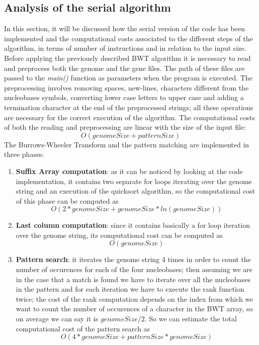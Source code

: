 \documentclass[final,5p,times,twocolumn,authoryear]{elsarticle}
\begin{document}
\subsection{Analysis of the serial algorithm}
In this section, it will be discussed how the serial version of the code has been implemented and the computational costs associated to the different steps of the algorithm, in terms of number of instructions and in relation to the input size. \\
Before applying the previously described BWT algorithm it is necessary to read and preprocess both the genome and the gene files. The path of these files are passed to the \emph{main()} function as parameters when the program is executed. The preprocessing involves removing spaces, new-lines, characters different from the nucleobases symbols, converting lower case letters to upper case and adding a termination character at the end of the preprocessed strings; all these operations are necessary for the correct execution of the algorithm. The computational costs of both the reading and preprocessing are linear with the size of the input file: 
$$ O(genomeSize + patternSize) $$
The Burrows-Wheeler Transform and the pattern matching are implemented in three phases: \\
\begin{enumerate}
   \item \textbf{Suffix Array computation}: as it can be noticed by looking at the code implementation\cite{bwt.h me}, it contains two separate for loops iterating over the genome string and an execution of the quicksort algorithm, so the computational cost of this phase can be computed as $$O(2*genomeSize + genomeSize*ln(genomeSize))$$
   \item \textbf{Last column computation}: since it contains basically a for loop iteration over the genome string, its computational cost can be computed as $$O(genomeSize)$$
   \item \textbf{Pattern search}: it iterates the genome string 4 times in order to count the number of occurences for each of the four nucleobases; then assuming we are in the case that a match is found we have to iterate over all the nucleobases in the pattern and for each iteration we have to execute the rank function twice; the cost of the rank computation depends on the index from which we want to count the number of occurences of a character in the BWT array, so on average we can say it is $genomeSize/2$. So we can estimate the total computational cost of the pattern search as
   $$O(4*genomeSize + patternSize*genomeSize)$$
\end{enumerate}
\end{document}
